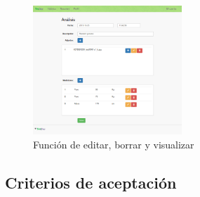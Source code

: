\documentclass[a4paper,12pt]{article}
\begin{document}
    \begin{figure}[h]
        \centering
        \includegraphics[width=0.5\textwidth]{img/5-mediciones_cargadas}
        \caption{Función de editar, borrar y visualizar}
		\label{5-mediciones_cargadas}
    \end{figure}


\clearpage

\subsection{Criterios de aceptación}
\end{document}
